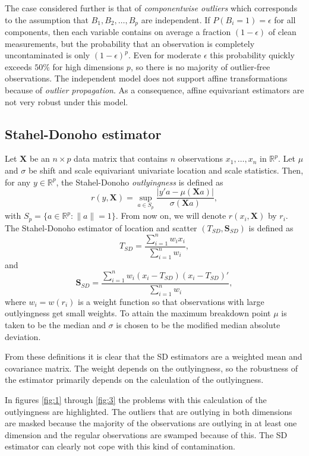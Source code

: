 The case considered further is that of \emph{componentwise outliers} which
corresponds to the assumption that
$\mathit{B}_1, \mathit{B}_2, \dots, \mathit{B}_p$ are independent.
If $P(\mathit{B}_i = 1) = \epsilon$ for all components, then each variable contains
on average a fraction $(1-\epsilon)$ of clean measurements, but the probability
that an observation is completely uncontaminated is only $(1-\epsilon)^p$.
Even for moderate $\epsilon$ this probability quickly exceeds $50\%$ for high
dimensions $p$, so there is no majority of outlier-free observations.
The independent model does not support affine transformations because of
\emph{outlier propagation}.
As a consequence, affine equivariant estimators are not very robust under this
model.

\subsection{Stahel-Donoho estimator}
Let $\mathbf{X}$ be an $n \times p$ data matrix that contains $n$ observations
$x_1, \dots, x_n$ in $\mathbb{R}^p$.
Let $\mu$ and $\sigma$ be shift and scale equivariant univariate location and
scale statistics.
Then, for any $y \in \mathbb{R}^p$, the Stahel-Donoho \emph{outlyingness} is
defined as
    \[ r(y, \mathbf{X}) = \sup_{a \in S_p} \frac{|y' a - \mu(\mathbf{X}a)|}
        {\sigma(\mathbf{X}a)}, \]
with $S_p = \{ a \in \mathbb{R}^p : \|a\| = 1 \}$.
From now on, we will denote $r(x_i, \mathbf{X})$ by $r_i$.
The Stahel-Donoho estimator of location and scatter $(T_{SD}, \mathbf{S}_{SD})$
is defined as
    \[ T_{SD} = \frac{\sum\limits_{i=1}^n w_i x_i}{\sum\limits_{i=1}^n w_i}, \]
and
    \[ \mathbf{S}_{SD} = \frac{\sum\limits_{i=1}^n w_i (x_i - T_{SD})(x_i - T_{SD})'}
        {\sum\limits_{i=1}^n w_i}, \]
where $w_i = w(r_i)$ is a weight function so that observations with large
outlyingness get small weights.
To attain the maximum breakdown point $\mu$ is taken to be the median and
$\sigma$ is chosen to be the modified median absolute deviation.

From these definitions it is clear that the SD estimators are a weighted mean
and covariance matrix.
The weight depends on the outlyingness, so the robustness of the estimator
primarily depends on the calculation of the outlyingness.

In figures \ref{fig:1} through \ref{fig:3} the problems with this calculation
of the outlyingness are highlighted.
The outliers that are outlying in both dimensions are masked because the
majority of the observations are outlying in at least one  dimension and the
regular observations are swamped because of this.
The SD estimator can clearly not cope with this kind of contamination.

